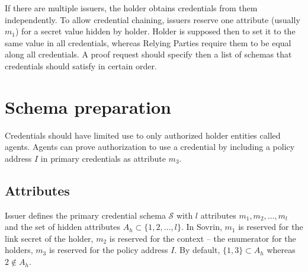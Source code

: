 \documentclass[a4paper]{article}
\begin{document}
If there are multiple issuers, the holder obtains  credentials from them independently. To allow credential chaining, issuers reserve one attribute (usually $m_1$)  for a secret value hidden by holder. Holder is supposed then to set it to the same value in all credentials,
whereas Relying Parties require them to be equal along all credentials. A proof request should specify then a list of schemas that credentials should satisfy in certain order.

\section{Schema preparation}






Credentials should have limited use to only authorized holder entities called agents. Agents can prove authorization to use a credential by including a policy address $I$ in primary credentials as attribute $m_3$.

\begin{comment}
\subsection{Holder setup}
\begin{enumerate}
    \item Generate a random 256-bit link secret $K$ (possibly the same for all issuers). $m_1 \leftarrow K$ for all credentials.
    \item Generate a random 256-bit policy address $I$ (possibly the same for all issuers). $m_3 \leftarrow I$ for all credentials.
\end{enumerate}


\subsection{Issuer setup}
\end{comment}
\label{sec:iss-setup}

\subsection{Attributes}\label{sec:setup-attr}
Issuer defines the primary credential schema $\mathcal{S}$ with $l$ attributes $m_1,m_2,\ldots, m_l$ and the set of hidden attributes $A_h \subset \{1,2,\ldots,l\}$. In Sovrin, $m_1$ is reserved for the link secret of the holder, $m_2$ is reserved for the context -- the enumerator for the holders, $m_3$ is reserved for the policy address $I$. By default, $\{1,3\}\subset A_h$ whereas $2\notin A_h$.
\end{document}
